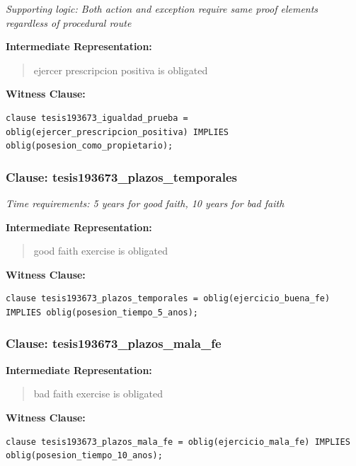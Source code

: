 \documentclass[11pt,a4paper]{article}
\begin{document}
\textit{Supporting logic: Both action and exception require same proof elements regardless of procedural route}

\textbf{Intermediate Representation:}

\begin{quote}
ejercer prescripcion positiva is obligated
\end{quote}

\textbf{Witness Clause:}

\begin{lstlisting}[style=witnessstyle, language=Witness]
clause tesis193673_igualdad_prueba = oblig(ejercer_prescripcion_positiva) IMPLIES oblig(posesion_como_propietario);
\end{lstlisting}

\subsubsection{Clause: tesis193673\_plazos\_temporales}

\textit{Time requirements: 5 years for good faith, 10 years for bad faith}

\textbf{Intermediate Representation:}

\begin{quote}
good faith exercise is obligated
\end{quote}

\textbf{Witness Clause:}

\begin{lstlisting}[style=witnessstyle, language=Witness]
clause tesis193673_plazos_temporales = oblig(ejercicio_buena_fe) IMPLIES oblig(posesion_tiempo_5_anos);
\end{lstlisting}

\subsubsection{Clause: tesis193673\_plazos\_mala\_fe}

\textbf{Intermediate Representation:}

\begin{quote}
bad faith exercise is obligated
\end{quote}

\textbf{Witness Clause:}

\begin{lstlisting}[style=witnessstyle, language=Witness]
clause tesis193673_plazos_mala_fe = oblig(ejercicio_mala_fe) IMPLIES oblig(posesion_tiempo_10_anos);
\end{lstlisting}
\end{document}

